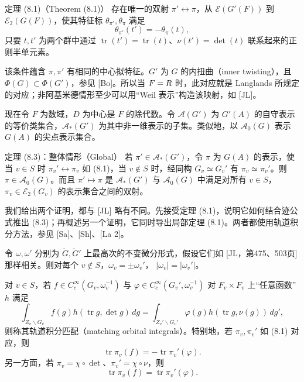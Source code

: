 \begin{originaltheorem}{定理 (8.1)（Theorem (8.1)）}
存在唯一的双射 $\pi'\leftrightarrow\pi$，从 $\mathcal E(G'(F))$ 到 $\mathcal E_2(G(F))$，使其特征标
$\theta_{\pi'},\theta_\pi$ 满足
\begin{equation}
 \theta_{\pi'}(t')=-\theta_\pi(t),\tag{8.2}
\end{equation}
只要 $t,t'$ 为两个群中通过
$\operatorname{tr}(t')=\operatorname{tr}(t)$、$\nu(t')=\det(t)$ 联系起来的正则半单元素。
\end{originaltheorem}
该条件蕴含 $\pi,\pi'$ 有相同的中心拟特征。$G'$ 为 $G$ 的内扭曲（inner twisting），且
$\Phi(G)\subset\Phi(G')$，参见 [Bo]。所以当 $F=R$ 时，此对应就是 Langlands 所规定的对应；非阿基米德情形至少可以用“Weil 表示”构造该映射，如 [JL]。

现在令 $F$ 为数域，$D$ 为中心是 $F$ 的除代数。令 $\mathcal A(G')$ 为 $G'(A)$ 的自守表示的等价类集合，$\mathcal A_*(G')$ 为其中非一维表示的子集。类似地，以
$\mathcal A_0(G)$ 表示 $G(A)$ 的尖点表示集合。
\begin{originaltheorem}{定理 (8.3)：整体情形（Global）}
若 $\pi'\in\mathcal A_*(G')$，令 $\pi$ 为 $G(A)$ 的表示，使当 $v\in S$ 时
$\pi_v'\leftrightarrow\pi_v$ 如 (8.1)，当 $v\notin S$ 时，经同构 $G_v\simeq G_v'$ 有
$\pi_v\simeq\pi_v'$。则 $\pi\in\mathcal A_0(G)$。而且 $\pi'\mapsto\pi$ 是
$\mathcal A_*(G')$ 与 $\mathcal A_0(G)$ 中满足对所有 $v\in S$，$\pi_v\in\mathcal E_2(G_v)$ 的表示集合之间的双射。
\end{originaltheorem}

我们给出两个证明，都与 [JL] 略有不同。先接受定理 (8.1)，说明它如何结合迹公式推出 (8.3)；再概述另一个证明，它同时导出局部定理 (8.1)。两者都使用轨道积分方法，参见 [Sa]、[Sh]、[La 2]。

令 $\omega,\omega'$ 分别为 $\widetilde G,\widetilde G'$ 上最高次的不变微分形式，假设它们如
[JL，第475、503页] 那样相关。则对每个 $v\notin S$，$\omega_v=\pm\omega_v'$，
$|\omega_v|=|\omega_v'|$。

对 $v\in S$，若 $f\in C_c^\infty(G_v,\omega_v^{-1})$ 与
$\varphi\in C_c^\infty(G_v',\omega_v^{-1})$ 对 $F_v\times F_v$ 上“任意函数”$h$ 满足
\begin{equation}
 \int_{Z_v\backslash G_v}f(g)h(\operatorname{tr}g,\det g)\,dg
 =\int_{Z_v'\backslash G_v'}\varphi(g)h(\operatorname{tr}g,\nu(g))\,dg',\tag{8.4}
\end{equation}
则称其轨道积分匹配（matching orbital integrals）。特别地，若 $\pi_v,\pi_v'$ 如 (8.1) 对应，则
\begin{equation}
 \operatorname{tr}\pi_v(f)=-\operatorname{tr}\pi_v'(\varphi).\tag{8.5}
\end{equation}
另一方面，若 $\pi_v=\chi\circ\det$、$\pi_v'=\chi\circ\nu$，则
\begin{equation}
 \operatorname{tr}\pi_v(f)=\operatorname{tr}\pi_v'(\varphi).\tag{8.6}
\end{equation}

